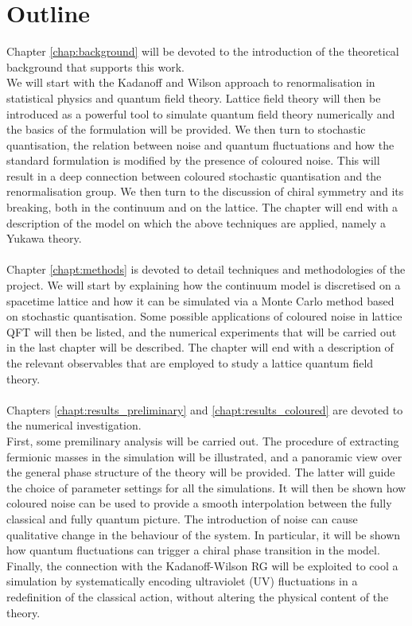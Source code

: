 \section{Outline}
Chapter \ref{chap:background} will be devoted to the introduction of the theoretical background that supports this work. \\
We will start with the Kadanoff and Wilson approach to renormalisation in statistical physics and quantum field theory.
Lattice field theory will then be introduced as a powerful tool to simulate quantum field theory numerically and the basics of the formulation will be provided.     
We then turn to stochastic quantisation, the relation between noise and quantum fluctuations and how the standard formulation is modified by the presence of coloured noise. 
This will result in a deep connection between coloured stochastic quantisation and the renormalisation group. We then turn to the discussion of chiral symmetry and its breaking, both in the continuum and on the lattice.
The chapter will end with a description of the model on which the above techniques are applied, namely a Yukawa theory. \\~\\
Chapter \ref{chapt:methods} is devoted to detail techniques and methodologies of the project. We will start by explaining how the continuum model is discretised on a spacetime lattice and how it can be simulated via a Monte Carlo method based on stochastic quantisation.
Some possible applications of coloured noise in lattice QFT will then be listed, and the numerical experiments that will be carried out in the last chapter will be described.
The chapter will end with a description of the relevant observables that are employed to study a lattice quantum field theory. \\~\\
Chapters \ref{chapt:results_preliminary} and \ref{chapt:results_coloured} are devoted to the numerical investigation. \\
First, some premilinary analysis will be carried out. The procedure of extracting fermionic masses in the simulation will be illustrated, and a panoramic view over the general phase structure of the theory will be provided. The latter will guide the choice of parameter settings for all the simulations.
It will then be shown how coloured noise can be used to provide a smooth interpolation between the fully classical and fully quantum picture.
The introduction of noise can cause qualitative change in the behaviour of the system. In particular, it will be shown how quantum fluctuations can trigger a chiral phase transition in the model.
Finally, the connection with the Kadanoff-Wilson RG will be exploited to cool a simulation by systematically encoding ultraviolet (UV) fluctuations in a redefinition of the classical action, without altering the physical content of the theory.
